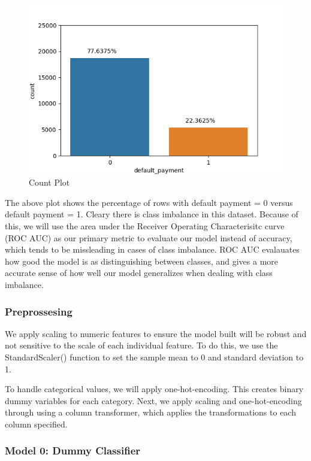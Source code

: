 \documentclass[
]{article}
\begin{document}
\begin{figure}

{\centering \includegraphics[width=0.8\linewidth]{../results/class_imbalance} 

}

\caption{Count Plot}\label{fig:class-imbalance}
\end{figure}

The above plot shows the percentage of rows with default payment = 0
versus default payment = 1. Cleary there is class imbalance in this
dataset. Because of this, we will use the area under the Receiver
Operating Characterisitc curve (ROC AUC) as our primary metric to
evaluate our model instead of accuracy, which tends to be missleading in
cases of class imbalance. ROC AUC evalauates how good the model is as
distinguishing between classes, and gives a more accurate sense of how
well our model generalizes when dealing with class imbalance.

\hypertarget{preprossesing}{%
\subsubsection{Preprossesing}\label{preprossesing}}

We apply scaling to numeric features to ensure the model built will be
robust and not sensitive to the scale of each individual feature. To do
this, we use the StandardScaler() function to set the sample mean to 0
and standard deviation to 1.

To handle categorical values, we will apply one-hot-encoding. This
creates binary dummy variables for each category. Next, we apply scaling
and one-hot-encoding through using a column transformer, which applies
the transformations to each column specified.

\hypertarget{model-0-dummy-classifier}{%
\subsubsection{Model 0: Dummy
Classifier}\label{model-0-dummy-classifier}}
\end{document}
